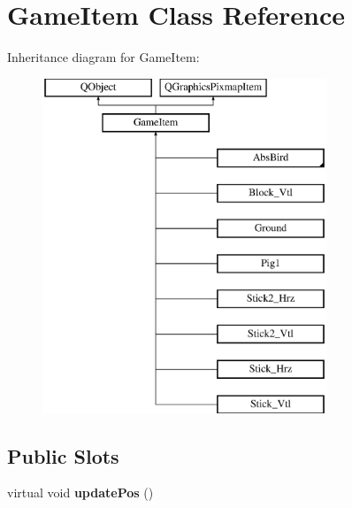 \hypertarget{classGameItem}{}\section{Game\+Item Class Reference}
\label{classGameItem}
Inheritance diagram for Game\+Item\+:\begin{figure}[H]
\begin{center}
\leavevmode
\includegraphics[height=10.000000cm]{classGameItem}
\end{center}
\end{figure}
\subsection*{Public Slots}
\begin{DoxyCompactItemize}
\item 
virtual void {\bfseries update\+Pos} ()\hypertarget{classGameItem_a9aadda5a28f03fc9976f8dd994ac2ce7}{}\label{classGameItem_a9aadda5a28f03fc9976f8dd994ac2ce7}

\end{DoxyCompactItemize}
